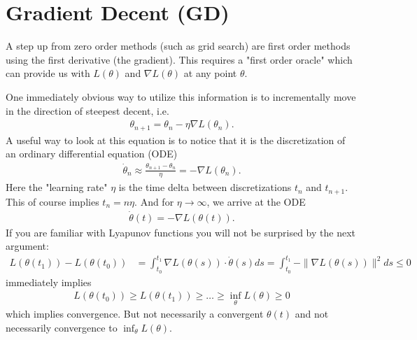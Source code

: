
\newcommand{\identity}{\mathbb{I}}
\newcommand{\lbound}{\mu_l}
\newcommand{\ubound}{\mu_u}
\newcommand{\diag}{\text{diag}}
\newcommand{\rate}{\text{rate}}
\newcommand{\reals}{\mathbb{R}}
\newcommand{\firstOrderMethod}{\mathcal{M}}

\chapter{Gradient Decent (GD)}

A step up from zero order methods (such as grid search) are first order methods
using the first derivative (the gradient). This requires a "first order oracle"
which can provide us with \(L(\theta)\) and \(\nabla L(\theta)\) at any point
\(\theta\).

One immediately obvious way to utilize this information is to
incrementally move in the direction of steepest decent, i.e.
%
\begin{align*}
	\theta_{n+1} = \theta_n - \eta\nabla L(\theta_n).
\end{align*}
%
A useful way to look at this equation is to notice that it is the
discretization of an ordinary differential equation (ODE)
%
\begin{align*}
	\dot{\theta}_n \approx \frac{\theta_{n+1} - \theta_n}{\eta}
	= - \nabla L(\theta_n).
\end{align*}
%
Here the "learning rate" \(\eta\) is the time delta between discretizations
\(t_n\) and \(t_{n+1}\). This of course implies \(t_n = n\eta\). And for
\(\eta\to\infty\), we arrive at the ODE
%
\begin{align}\label{eq: velocity is gradient}
	\dot{\theta}(t) = -\nabla L(\theta(t)).
\end{align}
%
If you are familiar with Lyapunov functions you will not be surprised by the next
argument:
%
\begin{align}\label{eq: gradient integral}
	L(\theta(t_1)) - L(\theta(t_0))
	&= \int_{t_0}^{t_1} \nabla L(\theta(s)) \cdot \dot{\theta}(s) ds
	= \int_{t_0}^{t_1} -\|\nabla L(\theta(s))\|^2 ds
	\le 0
\end{align}
%
immediately implies
\begin{align*}
	L(\theta(t_0)) \ge L(\theta(t_1)) \ge \dots \ge \inf_\theta L(\theta) \ge 0
\end{align*}
which implies convergence. But not necessarily a convergent \(\theta(t)\) and
not necessarily convergence to \(\inf_\theta L(\theta)\).

